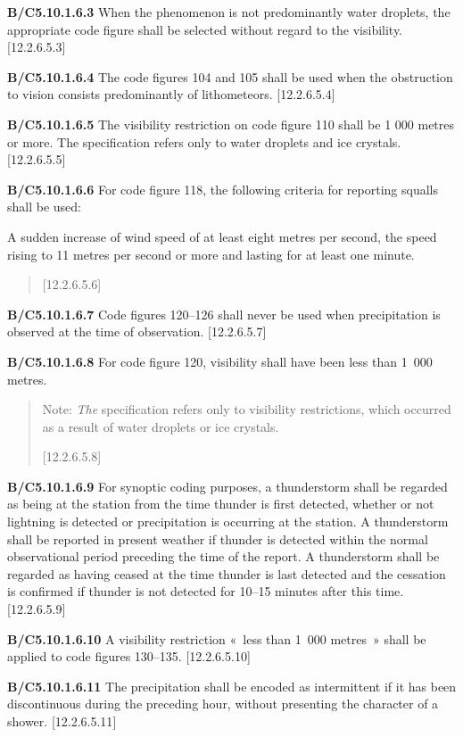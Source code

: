 \textbf{B/C5.10.1.6.3} When the phenomenon is not predominantly water droplets, the appropriate code figure shall be selected without regard to the visibility. {[}12.2.6.5.3{]}

\textbf{B/C5.10.1.6.4} The code figures 104 and 105 shall be used when the obstruction to vision consists predominantly of lithometeors. {[}12.2.6.5.4{]}

\textbf{B/C5.10.1.6.5} The visibility restriction on code figure 110 shall be 1 000 metres or more. The specification refers only to water droplets and ice crystals. {[}12.2.6.5.5{]}

\textbf{B/C5.10.1.6.6} For code figure 118, the following criteria for reporting squalls shall be used:

A sudden increase of wind speed of at least eight metres per second, the speed rising to 11 metres per second or more and lasting for at least one minute.

\begin{quote}
{[}12.2.6.5.6{]}
\end{quote}

\textbf{B/C5.10.1.6.7} Code figures 120--126 shall never be used when precipitation is observed at the time of observation. {[}12.2.6.5.7{]}

\textbf{B/C5.10.1.6.8} For code figure 120, visibility shall have been less than 1~000 metres.

\begin{quote}
Note: \emph{The} specification refers only to visibility restrictions, which occurred as a result of water droplets or ice crystals.

{[}12.2.6.5.8{]}
\end{quote}

\textbf{B/C5.10.1.6.9} For synoptic coding purposes, a thunderstorm shall be regarded as being at the station from the time thunder is first detected, whether or not lightning is detected or precipitation is occurring at the station. A thunderstorm shall be reported in present weather if thunder is detected within the normal observational period preceding the time of the report. A thunderstorm shall be regarded as having ceased at the time thunder is last detected and the cessation is confirmed if thunder is not detected for 10--15 minutes after this time. {[}12.2.6.5.9{]}

\textbf{B/C5.10.1.6.10} A visibility restriction «~less than 1~000 metres~» shall be applied to code figures 130--135. {[}12.2.6.5.10{]}

\textbf{B/C5.10.1.6.11} The precipitation shall be encoded as intermittent if it has been discontinuous during the preceding hour, without presenting the character of a shower. {[}12.2.6.5.11{]}

